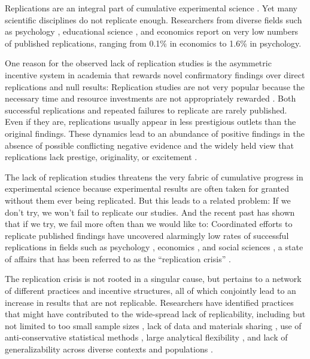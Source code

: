 \documentclass[cm,linguex]{glossa}
\begin{document}
Replications are an integral part of cumulative experimental science \citep[e.g.,][]{campbell_reforms_1969, rosenthal_replication_1990, zwaan_making_2018}. Yet many scientific disciplines do not replicate enough. Researchers from diverse fields such as psychology \citep{makel_replications_2012}, educational science \citep{makel_facts_2014}, and economics \citep{mueller2019replication} report on very low numbers of published replications, ranging from 0.1\% in economics to 1.6\% in psychology.

One reason for the observed lack of replication studies is the asymmetric incentive system in academia that rewards novel confirmatory findings over direct replications and null results: Replication studies are not very popular because the necessary time and resource investments are not appropriately rewarded \citep[e.g.,][]{koole_rewarding_2012, nosek_scientific_2012}. Both successful replications \citep{madden_how_1995} and repeated failures to replicate \citep[e.g.,][]{doyen_behavioral_2012} are rarely published. Even if they are, replications usually appear in less prestigious outlets than the original findings. These dynamics lead to an abundance of positive findings in the absence of possible conflicting negative evidence \citep[see also][]{fanelli_pressures_2010} and the widely held view that replications lack prestige, originality, or excitement \citep[e.g.,][]{lindsay1993design}.

The lack of replication studies threatens the very fabric of cumulative progress in experimental science because experimental results are often taken for granted without them ever being replicated. But this leads to a related problem: If we don't try, we won't fail to replicate our studies. And the recent past has shown that if we try, we fail more often than we would like to: Coordinated efforts to replicate published findings have uncovered alarmingly low rates of successful replications in fields such as psychology \citep{open_science_collaboration_estimating_2015}, economics \citep{camerer_evaluating_2016}, and social sciences \citep{camerer_evaluating_2018}, a state of affairs that has been referred to as the ``replication crisis'' \citep{fidler_reproducibility_2018}.

The replication crisis is not rooted in a singular cause, but pertains to a network of different practices and incentive structures, all of which conjointly lead to an increase in results that are not replicable. Researchers have identified practices that might have contributed to the wide-spread lack of replicability, including but not limited to too small sample sizes \citep[e.g.,][]{button2013power}, lack of data and materials sharing \citep[e.g.,][]{nosek2015promoting}, use of anti-conservative statistical methods \citep[e.g.,][]{yarkoni2019generalizability}, large analytical flexibility \citep[e.g.,][]{simmons2011false}, and lack of generalizability across diverse contexts and populations \citep{henrich2010weirdest}.
\end{document}
